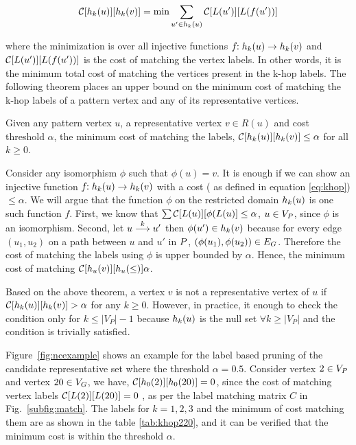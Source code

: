  \begin{equation} \label{eq:khop} \khopcost{k}{u}{v} =
     \text{min}\displaystyle\sum_{u' \in \khopl{k}{u}}
     \labcost{C}{L(u')}{L(f(u'))} \end{equation}

 where the minimization is over all injective functions $f\!\!:\khopl{k}{u}
 \rightarrow \khopl{k}{v}$ and $\labcost{C}{L(u')}{L(f(u'))}$ is the cost of
 matching the vertex labels.  In other words, it is the minimum total cost of
 matching the vertices present in the k-hop labels.  The following theorem
 places an upper bound on the minimum cost of matching the k-hop labels of
 a pattern vertex and any of its representative vertices.


\begin{thm} 
\label{thm:khop}
Given any pattern vertex $u$, a representative vertex $v \in R(u)$
    and cost threshold $\alpha$, the minimum cost of matching the \khop labels,
    $\khopcost{k}{u}{v} \leq \alpha$ for all $k \geq 0$.

\begin{myproof} Consider any isomorphism $\phi$ such that $\phi(u) = v$. It is
    enough if we can show an injective function $f\!\!:\khopl{k}{u} \rightarrow
    \khopl{k}{v}$ with a cost ( as defined in equation \ref{eq:khop}) $\leq
    \alpha$. We will argue that the function $\phi$ on the restricted domain
    $\khopl{k}{u}$ is one such function $f$.  First, we know that
    $\sum\labcost{C}{L(u)}{\phi(L(u)} \leq \alpha$, $u \in \vp$, since $\phi$ is
    an isomorphism. Second, let $\kpath{u}{u'}{k}$ then $\phi(u') \in
    \khopl{k}{v}$ because for every edge $(u_1, u_2)$ on a path between $u$ and
    $u'$ in $\pat$, $(\phi(u_1),\phi(u_2)) \in \eg$.  Therefore the cost
    of matching the \khop labels using $\phi$ is  upper bounded by $\alpha$.  Hence,
    the minimum cost of matching $\khopcost{u}{v} \leq \alpha$.
    \end{myproof}
    \label{thm:khop} \end{thm}

Based on the above theorem, a vertex $v$ is not a representative vertex of $u$
if $\khopcost{k}{u}{v} > \alpha$ for any $k \geq 0$. However, in practice, it
enough to check the condition only for $k \leq |V_P|-1$ because $\khopl{k}{u}$
is the null set $\forall k \geq |V_P|$ and the condition is trivially satisfied.

Figure~\ref{fig:ncexample} shows an example for the \khop label based pruning of
the candidate representative set where the threshold $\alpha = 0.5$. Consider
vertex $2 \in \vp$ and vertex $20 \in \vg$, we have, $\khopcost{0}{2}{20} = 0$,
since the cost of matching vertex labels $\labcost{C}{L(2)}{L(20)} = 0$ , as per
the label matching matrix $C$ in Fig.~\ref{subfig:match}. The \khop labels for
$k=1,2,3$ and the minimum of cost matching them are as shown in the table
\ref{tab:khop220}, and it can be verified that the minimum cost is within the
threshold $\alpha$.

